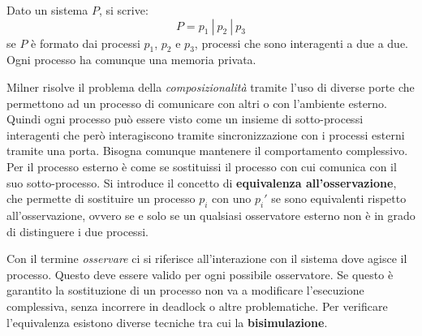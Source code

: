 Dato un sistema $P$, si scrive:
\begin{equation}
    P = p_1 \ | \ p_2 \ | \ p_3
\end{equation}
se $P$ è formato dai processi $p_1$, $p_2$ e $p_3$, processi che sono interagenti a
due a due. Ogni processo ha comunque una memoria privata.

Milner risolve il problema della \textit{composizionalità} tramite l'uso di diverse
porte che permettono ad un processo di comunicare con altri o con l'ambiente esterno.
Quindi ogni processo può essere visto come un insieme di sotto-processi interagenti
che però interagiscono tramite sincronizzazione con i processi esterni tramite
una porta. Bisogna comunque mantenere il comportamento complessivo. Per il
processo esterno è come se sostituissi il processo con cui comunica con il suo
sotto-processo. Si introduce il concetto di \textbf{equivalenza all'osservazione},
che permette di sostituire un processo $p_i$ con uno $p_i'$ se sono equivalenti
rispetto all'osservazione, ovvero se e solo se un qualsiasi osservatore esterno
non è in grado di distinguere i due processi.

Con il termine \textit{osservare} ci si riferisce all'interazione con il sistema
dove agisce il processo. Questo deve essere valido per ogni possibile osservatore.
Se questo è garantito la sostituzione di un processo non va a modificare
l'esecuzione complessiva, senza incorrere in deadlock o altre problematiche.
Per verificare l'equivalenza esistono diverse tecniche tra cui la \textbf{bisimulazione}.

